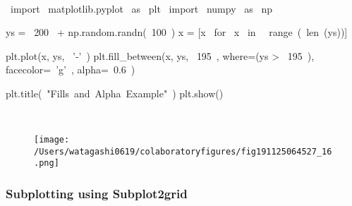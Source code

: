 \begin{paracol}{2}
\smallskip
\begin{cellExecute}[escapechar=~]
~~
\end{cellExecute}
\switchcolumn
\begin{codeCell}[escapechar=~]
~\textcolor{mtk17}{import}~ matplotlib.pyplot ~\textcolor{mtk17}{as}~ plt
~\textcolor{mtk17}{import}~ numpy ~\textcolor{mtk17}{as}~ np

ys = ~\textcolor{mtk7}{200}~ + np.random.randn(~\textcolor{mtk7}{100}~)
x = [x ~\textcolor{mtk17}{for}~ x ~\textcolor{mtk6}{in}~ ~\textcolor{mtk13}{range}~(~\textcolor{mtk13}{len}~(ys))]

plt.plot(x, ys, ~\textcolor{mtk25}{'-'}~)
plt.fill_between(x, ys, ~\textcolor{mtk7}{195}~, where=(ys > ~\textcolor{mtk7}{195}~), facecolor=~\textcolor{mtk25}{'g'}~, alpha=~\textcolor{mtk7}{0.6}~)

plt.title(~\textcolor{mtk25}{"Fills and Alpha Example"}~)
plt.show()
\end{codeCell}
\end{paracol}

\begin{paracol}{2}
\begin{cellExecute}[escapechar=~]
~~
\end{cellExecute}
\switchcolumn
\begin{resultCell}[escapechar=~]
\end{resultCell}
\end{paracol}

\begin{figure}[H]
\centering
\texttt{[image: /Users/watagashi0619/colaboratoryfigures/fig191125064527\_16.png]}
\end{figure}
\subsubsection{Subplotting using Subplot2grid}


